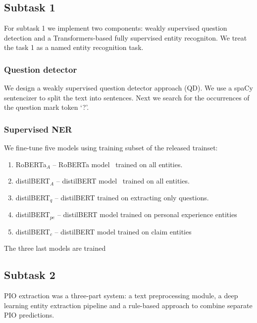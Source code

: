 \documentclass[11pt]{article}
\begin{document}
\subsection{Subtask 1} \label{sec:system1}
\label{subsec:syst_task1}
%
For subtask 1 we implement two components: weakly supervised question detection and a Transformers-based fully supervised entity recogniton.
We treat the task 1 as a named entity recognition task.

\subsubsection*{Question detector}


We design a weakly supervised question detector approach (QD).
We use a spaCy sentencizer to split the text into sentences.
Next we search for the occurrences of the question mark token `?'. 



\subsubsection*{Supervised NER}


We fine-tune five models using training subset of the released trainset:

\begin{enumerate}
\item RoBERTa$_A$ -- RoBERTa model~\cite{Liu2019RoBERTaAR} trained on all entities. %
\item distilBERT$_A$ -- distilBERT model~\cite{Sanh2019DistilBERTAD} trained on all entities.  %
\item  distilBERT$_q$ --  distilBERT trained on extracting only questions. %
\item distilBERT$_{pe}$ -- distilBERT model trained on personal experience entities %
\item distilBERT$_c$ -- distilBERT model trained on claim entities %
\end{enumerate}

The three last models are trained 



%
%
%
\subsection{Subtask 2}
\label{system:task2}
%
PIO extraction was a three-part system: a text preprocessing module, a deep learning entity extraction pipeline and a rule-based approach to combine separate PIO predictions.
%
%
%
\end{document}
